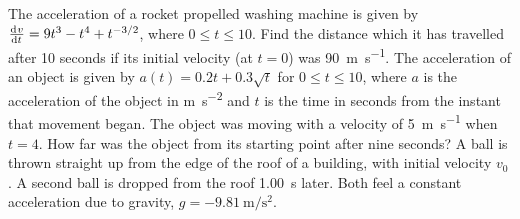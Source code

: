 \begin{questions}
  \questioM The acceleration of a rocket propelled washing machine is given by $ \od{v}{t} = 9t^3 - t^4 + t^{-3/2} $, where $ 0 \leq t \leq 10 $. Find
            the distance which it has travelled after 10 seconds if its initial velocity (at $ t = 0 $) was \SI{90}{\metre\per\second}.
  \questioM The acceleration of an object is given by $ a(t) = 0.2t + 0.3\sqrt{t} $ for $ 0 \leq t \leq 10 $, where $ a $ is the acceleration
            of the object in \si{\metre\per\second\squared} and $ t $ is the time in seconds from the instant that movement began. The object
            was moving with a velocity of \SI{5}{\metre\per\second} when $ t = 4 $. How far was the object from its starting point after nine seconds?
  \questioE A ball is thrown straight up from the edge of the roof of a building, with initial velocity $ v_0 $. A second ball is dropped from the
            roof \SI{1.00}{\second} later. Both feel a constant acceleration due to gravity, $ g = \SI{-9.81}{\metre\per\second\squared} $.
\end{questions}

